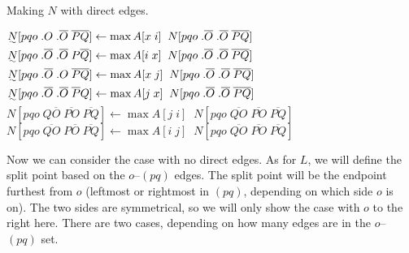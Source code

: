 \begin{finalEquation}
\caption{Making $N$ with direct edges.}
  $\uwave{N}[pqo \; .O \; .\overline{O} \; \overline{PQ}] \leftarrow \max A[x \; i] \; \; N[pqo \; .\overline{O} \; .\overline{O} \; \overline{PQ}]$ \\
  $\uwave{N}[pqo \; .\overline{O} \; .\overline{O} \; P\overline{Q}] \leftarrow \max A[i \; x] \; \; N[pqo \; .\overline{O} \; .\overline{O} \; \overline{PQ}]$ \\
  $\uwave{N}[pqo \; .\overline{O} \; .O \; \overline{PQ}] \leftarrow \max A[x \; j] \; \; N[pqo \; .\overline{O} \; .\overline{O} \; \overline{PQ}]$ \\
  $\uwave{N}[pqo \; .\overline{O} \; .\overline{O} \; \overline{P}Q] \leftarrow \max A[j \; x] \; \; N[pqo \; .\overline{O} \; .\overline{O} \; \overline{PQ}]$ \\
  $N[pqo \; Q\overline{O} \; \overline{PO} \; \overline{PQ}] \leftarrow \max A[j \; i] \; \; N[pqo \; \overline{QO} \; \overline{PO} \; \overline{PQ}]$ \\
  $N[pqo \; \overline{QO} \; P\overline{O} \; \overline{PQ}] \leftarrow \max A[i \; j] \; \; N[pqo \; \overline{QO} \; \overline{PO} \; \overline{PQ}]$
\end{finalEquation}

\begin{center}
\end{center}

Now we can consider the case with no direct edges.
As for $L$, we will define the split point based on the $o$--$(pq)$ edges.
The split point will be the endpoint furthest from $o$ (\myie leftmost or rightmost in $(pq)$, depending on which side $o$ is on).
The two sides are symmetrical, so we will only show the case with $o$ to the right here.
There are two cases, depending on how many edges are in the $o$--$(pq)$ set.

\begin{center}
\end{center}

